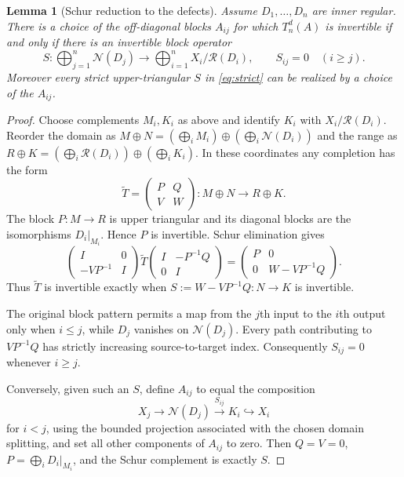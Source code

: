\documentclass[11pt]{article}
\newtheorem{lemma}[theorem]{Lemma}
\newcommand{\N}{\mathcal N}
\newcommand{\R}{\mathcal R}
\begin{document}
\begin{lemma}[Schur reduction to the defects]\label{lem:defect}
Assume $D_1,\ldots,D_n$ are inner regular.  There is a choice of the
off-diagonal blocks $A_{ij}$ for which $T_n^d(A)$ is invertible if and only if
there is an invertible block operator
\begin{equation}\label{eq:strict}
 S:\bigoplus_{j=1}^n\N(D_j)\longrightarrow
   \bigoplus_{i=1}^n X_i/\R(D_i),
 \qquad S_{ij}=0\quad(i\geq j).
\end{equation}
Moreover every strict upper-triangular $S$ in \eqref{eq:strict} can be
realized by a choice of the $A_{ij}$.
\end{lemma}

\begin{proof}
Choose complements $M_i,K_i$ as above and identify $K_i$ with
$X_i/\R(D_i)$.  Reorder the domain as
$M\oplus N=(\bigoplus_iM_i)\oplus(\bigoplus_i\N(D_i))$ and the range as
$R\oplus K=(\bigoplus_i\R(D_i))\oplus(\bigoplus_iK_i)$.  In these
coordinates any completion has the form
\[
 \widetilde T=\begin{pmatrix}P&Q\\ V&W\end{pmatrix}:M\oplus N\to R\oplus K.
\]
The block $P:M\to R$ is upper triangular and its diagonal blocks are the
isomorphisms $D_i|_{M_i}$.  Hence $P$ is invertible.  Schur elimination gives
\[
 \begin{pmatrix}I&0\\-VP^{-1}&I\end{pmatrix}
 \widetilde T
 \begin{pmatrix}I&-P^{-1}Q\\0&I\end{pmatrix}
 =\begin{pmatrix}P&0\\0&W-VP^{-1}Q\end{pmatrix}.
\]
Thus $\widetilde T$ is invertible exactly when
$S:=W-VP^{-1}Q:N\to K$ is invertible.

The original block pattern permits a map from the $j$th input to the $i$th
output only when $i\leq j$, while $D_j$ vanishes on $\N(D_j)$.  Every path
contributing to $VP^{-1}Q$ has strictly increasing source-to-target index.
Consequently $S_{ij}=0$ whenever $i\geq j$.

Conversely, given such an $S$, define $A_{ij}$ to equal the composition
\[
 X_j\longrightarrow\N(D_j)\xrightarrow{S_{ij}}K_i\hookrightarrow X_i
\]
for $i<j$, using the bounded projection associated with the chosen domain
splitting, and set all other components of $A_{ij}$ to zero.  Then
$Q=V=0$, $P=\bigoplus_iD_i|_{M_i}$, and the Schur complement is exactly
$S$.
\end{proof}
\end{document}
